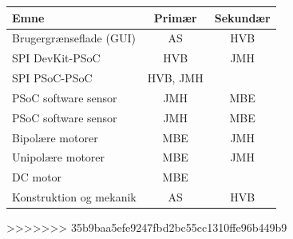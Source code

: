 \begin{tabular}{| l | c | c |}
\hline
Emne & Primær & Sekundær\\\hline
Brugergrænseflade (GUI) & AS & HVB\\\hline
SPI DevKit-PSoC & HVB & JMH\\\hline
SPI PSoC-PSoC & HVB, JMH & \\\hline
PSoC software sensor & JMH & MBE\\\hline
PSoC software sensor & JMH & MBE\\\hline
Bipolære motorer & MBE & JMH\\\hline
Unipolære motorer & MBE & JMH\\\hline
DC motor & MBE & \\\hline
Konstruktion og mekanik & AS & HVB\\\hline
\end{tabular}
>>>>>>> 35b9baa5efe9247fbd2bc55cc1310ffe96b449b9
